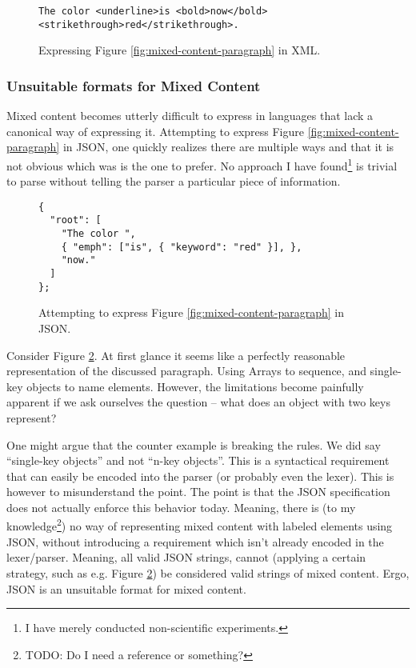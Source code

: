 \documentclass{scrreprt}
\begin{document}
\begin{figure}[h]
\begin{lstlisting}
The color <underline>is <bold>now</bold> <strikethrough>red</strikethrough>.
\end{lstlisting}
\caption{Expressing Figure \ref{fig:mixed-content-paragraph} in XML.}
\label{fig:mixed-content-xml}
\end{figure}



\subsubsection{Unsuitable formats for Mixed Content}
Mixed content becomes utterly difficult to express in languages that lack a canonical way of expressing it. Attempting to express Figure \ref{fig:mixed-content-paragraph} in JSON, one quickly realizes there are multiple ways and that it is not obvious which was is the one to prefer. No approach I have found\footnote{I have merely conducted non-scientific experiments.} is trivial to parse without telling the parser a particular piece of information.

\begin{figure}[h]
\begin{lstlisting}
{
  "root": [
    "The color ",
    { "emph": ["is", { "keyword": "red" }], },
    "now."
  ]
};
\end{lstlisting}
\caption{Attempting to express Figure \ref{fig:mixed-content-paragraph} in JSON.}
\label{fig:mixed-content-json}
\end{figure}


Consider Figure \ref{fig:mixed-content-json}. At first glance it seems like a perfectly reasonable representation of the discussed paragraph. Using Arrays to sequence, and single-key objects to name elements. However, the limitations become painfully apparent if we ask ourselves the question -- what does an object with two keys represent?

One might argue that the counter example is breaking the rules. We did say ``single-key objects'' and not ``n-key objects''. This is a syntactical requirement that can easily be encoded into the parser (or probably even the lexer). This is however to misunderstand the point. The point is that the JSON specification does not actually enforce this behavior today. Meaning, there is (to my knowledge\footnote{TODO: Do I need a reference or something?}) no way of representing mixed content with labeled elements using JSON, without introducing a requirement which isn't already encoded in the lexer/parser. Meaning, all valid JSON strings, cannot (applying a certain strategy, such as e.g. Figure \ref{fig:mixed-content-json}) be considered valid strings of mixed content. Ergo, JSON is an unsuitable format for mixed content.
\end{document}
